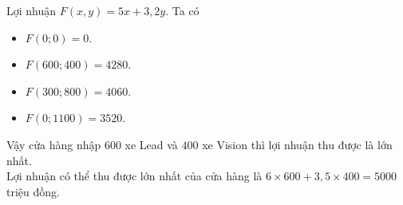 \begin{bt}
{\begin{center}
\end{center}
Lợi nhuận $ F(x,y)=5x+3{,}2y$. Ta có
\begin{itemize}
	\item $ F(0;0)=0$.
	\item $ F(600;400)=4280$.
	\item $ F(300;800)=4060$.
	\item $ F(0;1100)=3520$.
\end{itemize}
Vậy cửa hàng nhập $ 600$ xe Lead và $ 400$ xe Vision thì lợi nhuận thu được là lớn nhất.\\
Lợi nhuận có thể thu được lớn nhất của cửa hàng là $ 6\times 600+3{,}5\times 400=5000$ triệu đồng.
}
\end{bt}


